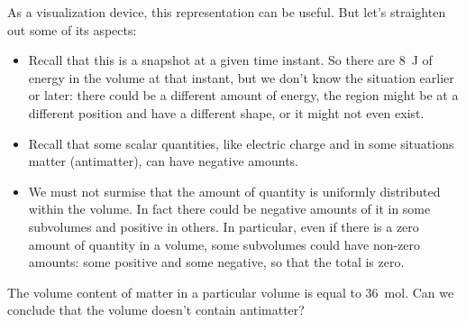 \documentclass[a4paper,12pt,%
onecolumn,oneside,%
british%
]{memoir}
\renewcommand*{\|}[1][]{\nonscript\:#1\vert\nonscript\:\mathopen{}}
\begin{document}
As a visualization device, this representation can be useful. But let's straighten out some of its aspects:
\begin{itemize}[para]
\item Recall that this is a snapshot at a given time instant. So there are \qty{8}{J} of energy in the volume at that instant, but we don't know the situation earlier or later: there could be a different amount of energy, the region might be at a different position and have a different shape, or it might not even exist.

\item Recall that some scalar quantities, like electric charge and in some situations matter (antimatter), can have negative amounts.

\item We must not surmise that the amount of quantity is uniformly distributed within the volume. In fact there could be negative amounts of it in some subvolumes and positive in others. In particular,  even if there is a zero amount of quantity in a volume, some subvolumes could have non-zero amounts: some positive and some negative, so that the total is zero.
\end{itemize}

\bigskip

\begin{exercise}
  The volume content of matter in a particular volume is equal to \qty{36}{mol}. Can we conclude that the volume doesn't contain antimatter?
\end{exercise}
\end{document}

